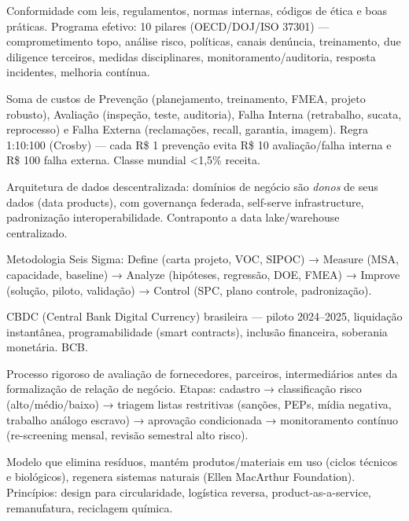 \begin{ecglossario}
\item[\textbf{Compliance}] Conformidade com leis, regulamentos, normas internas, códigos de ética e boas práticas. Programa efetivo: 10 pilares (OECD/DOJ/ISO 37301) — comprometimento topo, análise risco, políticas, canais denúncia, treinamento, due diligence terceiros, medidas disciplinares, monitoramento/auditoria, resposta incidentes, melhoria contínua.

\item[\textbf{Custo da Qualidade (CoQ)}] Soma de custos de Prevenção (planejamento, treinamento, FMEA, projeto robusto), Avaliação (inspeção, teste, auditoria), Falha Interna (retrabalho, sucata, reprocesso) e Falha Externa (reclamações, recall, garantia, imagem). Regra 1:10:100 (Crosby) — cada R\$ 1 prevenção evita R\$ 10 avaliação/falha interna e R\$ 100 falha externa. Classe mundial <1,5\% receita.

\item[\textbf{Data Mesh}] Arquitetura de dados descentralizada: domínios de negócio são \textit{donos} de seus dados (data products), com governança federada, self-serve infrastructure, padronização interoperabilidade. Contraponto a data lake/warehouse centralizado.

\item[\textbf{DMAIC}] Metodologia Seis Sigma: Define (carta projeto, VOC, SIPOC) → Measure (MSA, capacidade, baseline) → Analyze (hipóteses, regressão, DOE, FMEA) → Improve (solução, piloto, validação) → Control (SPC, plano controle, padronização).

\item[\textbf{Drex}] CBDC (Central Bank Digital Currency) brasileira — piloto 2024–2025, liquidação instantânea, programabilidade (smart contracts), inclusão financeira, soberania monetária. BCB.

\item[\textbf{Due Diligence de Terceiros}] Processo rigoroso de avaliação de fornecedores, parceiros, intermediários antes da formalização de relação de negócio. Etapas: cadastro → classificação risco (alto/médio/baixo) → triagem listas restritivas (sanções, PEPs, mídia negativa, trabalho análogo escravo) → aprovação condicionada → monitoramento contínuo (re-screening mensal, revisão semestral alto risco).

\item[\textbf{Economia Circular}] Modelo que elimina resíduos, mantém produtos/materiais em uso (ciclos técnicos e biológicos), regenera sistemas naturais (Ellen MacArthur Foundation). Princípios: design para circularidade, logística reversa, product-as-a-service, remanufatura, reciclagem química.


\end{ecglossario}
